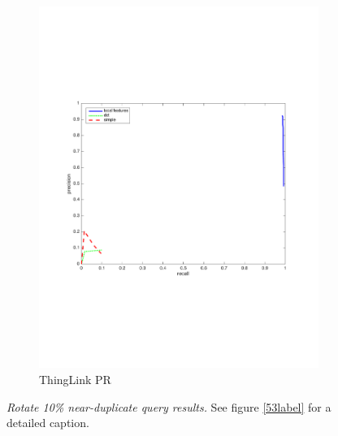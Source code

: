 \documentclass[english,12pt,a4paper,pdftex,elec,utf8, table]{aaltothesis}
\begin{document}
\begin{figure}[htb]
\begin{center}
\begin{subfigure}[b]{0.49\textwidth}
    \includegraphics[width=\textwidth]{figures/thinglink_Rotate10PR.pdf}
    \caption{ThingLink PR}
    \label{Rotateprthinglink}
  \end{subfigure}
  \caption{\emph{Rotate 10\% near-duplicate query results.} See figure \ref{53label} for a detailed caption.\label{rotatelabel}}
  \end{center}
\end{figure}
\end{document}
